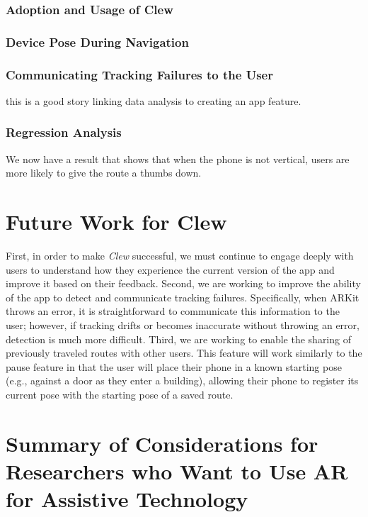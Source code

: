\documentclass[chi_draft]{sigchi}
\begin{document}

\subsubsection{Adoption and Usage of Clew}

\subsubsection{Device Pose During Navigation}

\subsubsection{Communicating Tracking Failures to the User}
this is a good story linking data analysis to creating an app feature.


\subsubsection{Regression Analysis}

We now have a result that shows that when the phone is not vertical, users are more likely to give the route a thumbs down.



\section{Future Work for Clew}
First, in order to make \emph{Clew} successful, we must continue to engage deeply with users to understand how they experience the current version of the app and improve it based on their feedback. Second, we are working to improve the ability of the app to detect and communicate tracking failures.  Specifically, when ARKit throws an error, it is straightforward to communicate this information to the user; however, if tracking drifts or becomes inaccurate without throwing an error, detection is much more difficult. Third, we are working to enable the sharing of previously traveled routes with other users.  This feature will work similarly to the pause feature in that the user will place their phone in a known starting pose (e.g., against a door as they enter a building), allowing their phone to register its current pose with the starting pose of a saved route.


\section{Summary of Considerations for Researchers who Want to Use AR for Assistive Technology}
\end{document}
